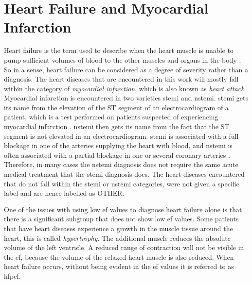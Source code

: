 \section{Heart Failure and Myocardial Infarction} \label{sec:heart_diseases}

Heart failure is the term used to describe when the heart muscle is unable to pump sufficient volumes of blood to the other muscles and organs in the body \cite{medicine_net}. So in a sense, heart failure can be considered as a degree of severity rather than a diagnosis. The heart diseases that are encountered in this work will mostly fall within the category of \textit{myocardial infarction}, which is also known as \textit{heart attack}. Myocardial infarction is encountered in two varieties \acrfull{stemi} and \acrfull{nstemi}. \acrshort{stemi} gets its name from the elevation of the ST segment of an electrocardiogram of a patient, which is a test performed on patients suspected of experiencing myocardial infarction \cite{ecg_stemi}. \acrshort{nstemi} then gets its name from the fact that the ST segment is not elevated in an electrocardiogram. \acrshort{stemi} is associated with a full blockage in one of the arteries supplying the heart with blood, and \acrshort{nstemi} is often associated with a partial blockage in one or several coronary arteries \cite{ambulanseforum}. Therefore, in many cases the \acrshort{nstemi} diagnosis does not require the same acute medical treatment that the \acrshort{stemi} diagnosis does. The heart diseases encountered that do not fall within the \acrshort{stemi} or \acrshort{nstemi} categories, were not given a specific label and are hence labelled as OTHER. \bigskip

One of the issues with using low \acrshort{ef} values to diagnose heart failure alone is that there is a significant subgroup that does not show low \acrshort{ef} values. Some patients that have heart diseases experience a growth in the muscle tissue around the heart, this is called \textit{hypertrophy}. The additional muscle reduces the absolute volume of the left ventricle. A reduced range of contraction will not be visible in the \acrshort{ef}, because the volume of the relaxed heart muscle is also reduced. When heart failure occurs, without being evident in the \acrshort{ef} values it is referred to as \acrshort{hfpef}. \bigskip

